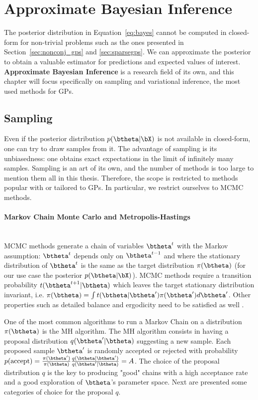 \section{Approximate Bayesian Inference}
\label{sec:approx_inf}

The posterior distribution in Equation~\eqref{eq:bayes} cannot be computed in closed-form for non-trivial problems such as the ones presented in Section~\ref{sec:nonconj_gps} and \ref{sec:sparsegps}.
We can approximate the posterior to obtain a valuable estimator for predictions and expected values of interest.
\textbf{Approximate Bayesian Inference} is a research field of its own, and this chapter will focus specifically on sampling and variational inference, the most used methods for \ac{GPs}.

\subsection{Sampling}

Even if the posterior distribution $p(\btheta|\bX)$ is not available in closed-form, one can try to draw samples from it.
The advantage of sampling is its unbiasedness: one obtains exact expectations in the limit of infinitely many samples.
Sampling is an art of its own, and the number of methods is too large to mention them all in this thesis.
Therefore, the scope is restricted to methods popular with or tailored to \ac{GPs}.
In particular, we restrict ourselves to \ac{MCMC} methods.

\paragraph{Markov Chain Monte Carlo and Metropolis-Hastings}\mbox{}\\
\acf{MCMC} methods generate a chain of variables $\btheta^t$ with the Markov assumption: $\btheta^t$ depends only on $\btheta^{t-1}$ and where the stationary distribution of $\btheta^t$ is the same as the target distribution $\pi(\btheta)$ (for our use case the posterior $p(\btheta|\bX)$).
\ac{MCMC} methods require a transition probability $t(\btheta^{t+1}|\btheta)$ which leaves the target stationary distribution invariant, i.e. $\pi(\btheta) = \int t(\btheta|\btheta')\pi(\btheta')d\btheta'$.
Other properties such as detailed balance and ergodicity need to be satisfied as well \cite{brooks2011handbook, o2004kendall}.

One of the most common algorithms to run a Markov Chain on a distribution $\pi(\btheta)$ is the \acf{MH} algorithm.
The \ac{MH} algorithm consists in having a proposal distribution $q(\btheta'|\btheta)$ suggesting a new sample.
Each proposed sample $\btheta'$ is randomly accepted or rejected with probability $p(\text{accept}) = \frac{\pi(\btheta')}{\pi(\btheta)}\frac{q(\btheta|\btheta')}{q(\btheta'|\btheta)} = A$.
The choice of the proposal distribution $q$ is the key to producing "good" chains with a high acceptance rate and a good exploration of $\btheta$'s parameter space.
Next are presented some categories of choice for the proposal $q$.


